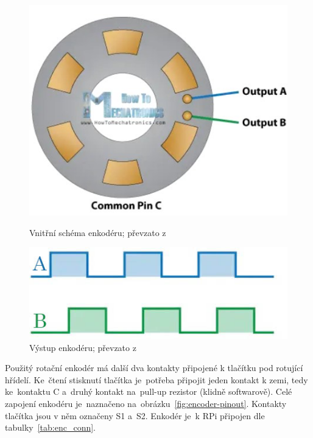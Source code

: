 \begin{figure}[htb]
  \centering
  \begin{minipage}{0.45\textwidth}
    \centering
    \includegraphics[width=1\textwidth]{img/encoder-working.jpg}
    \caption{\label{fig:encoder-working} Vnitřní schéma enkodéru; převzato z~\cite{how-encoders-work}}
  \end{minipage}\hfill
  \begin{minipage}{0.45\textwidth}
    \centering
    \includegraphics[width=1\textwidth]{img/encoder-graph.jpg}
    \caption{\label{fig:encoder-graph} Výstup enkodéru; převzato z~\cite{how-encoders-work}}
  \end{minipage}
\end{figure}

Použitý rotační enkodér má další dva kontakty připojené k tlačítku pod rotující hřídelí. Ke~čtení stisknutí tlačítka je~potřeba připojit jeden kontakt k zemi, tedy ke~kontaktu C a~druhý kontakt na~pull-up rezistor (klidně softwarově). Celé zapojení enkodéru je~naznačeno na~obrázku~\ref{fig:encoder-pinout}. Kontakty tlačítka jsou v něm označeny S1 a~S2. Enkodér je~k RPi připojen dle tabulky~\ref{tab:enc_conn}.

